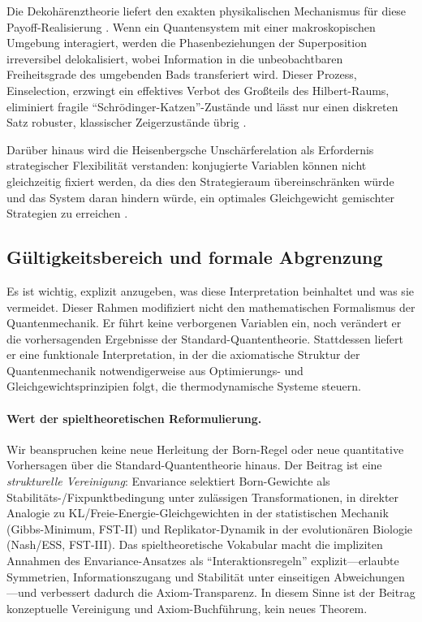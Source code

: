 \documentclass[12pt,a4paper]{article}
\theoremstyle{remark}
\begin{document}
Die Dekoh\"arenztheorie liefert den exakten physikalischen Mechanismus f\"ur diese Payoff-Realisierung \citep{MeasurementClassical}. Wenn ein Quantensystem mit einer makroskopischen Umgebung interagiert, werden die Phasenbeziehungen der Superposition irreversibel delokalisiert, wobei Information in die unbeobachtbaren Freiheitsgrade des umgebenden Bads transferiert wird. Dieser Prozess, Einselection, erzwingt ein effektives Verbot des Gro\ss{}teils des Hilbert-Raums, eliminiert fragile ``Schr\"odinger-Katzen''-Zust\"ande und l\"asst nur einen diskreten Satz robuster, klassischer Zeigerzust\"ande \"ubrig \citep{Zurek2003}.

Dar\"uber hinaus wird die Heisenbergsche Unsch\"arferelation als Erfordernis strategischer Flexibilit\"at verstanden: konjugierte Variablen k\"onnen nicht gleichzeitig fixiert werden, da dies den Strategieraum \"ubereinschr\"anken w\"urde und das System daran hindern w\"urde, ein optimales Gleichgewicht gemischter Strategien zu erreichen \citep{HeisenbergCovariant}.

\subsection{G\"ultigkeitsbereich und formale Abgrenzung}

Es ist wichtig, explizit anzugeben, was diese Interpretation beinhaltet und was sie vermeidet. Dieser Rahmen modifiziert nicht den mathematischen Formalismus der Quantenmechanik. Er f\"uhrt keine verborgenen Variablen ein, noch ver\"andert er die vorhersagenden Ergebnisse der Standard-Quantentheorie. Stattdessen liefert er eine funktionale Interpretation, in der die axiomatische Struktur der Quantenmechanik notwendigerweise aus Optimierungs- und Gleichgewichtsprinzipien folgt, die thermodynamische Systeme steuern.

\paragraph{Wert der spieltheoretischen Reformulierung.}
Wir beanspruchen keine neue Herleitung der Born-Regel oder neue quantitative Vorhersagen \"uber die Standard-Quantentheorie hinaus. Der Beitrag ist eine \emph{strukturelle Vereinigung}: Envariance selektiert Born-Gewichte als Stabilit\"ats-/Fixpunktbedingung unter zul\"assigen Transformationen, in direkter Analogie zu KL/Freie-Energie-Gleichgewichten in der statistischen Mechanik (Gibbs-Minimum, FST-II) und Replikator-Dynamik in der evolution\"aren Biologie (Nash/ESS, FST-III). Das spieltheoretische Vokabular macht die impliziten Annahmen des Envariance-Ansatzes als ``Interaktionsregeln'' explizit---erlaubte Symmetrien, Informationszugang und Stabilit\"at unter einseitigen Abweichungen---und verbessert dadurch die Axiom-Transparenz. In diesem Sinne ist der Beitrag konzeptuelle Vereinigung und Axiom-Buchf\"uhrung, kein neues Theorem.
\end{document}
